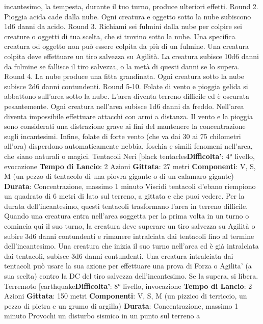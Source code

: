 \begin{multicols}{2}
incantesimo, la tempesta, durante il tuo turno, produce
ulteriori effetti.
Round 2. Pioggia acida cade dalla nube. Ogni creatura
e oggetto sotto la nube subiscono 1d6 danni da acido.
Round 3. Richiami sei fulmini dalla nube per colpire sei
creature o oggetti di tua scelta, che si trovino sotto la
nube. Una specifica creatura od oggetto non può
essere colpita da più di un fulmine. Una creatura colpita
deve effettuare un tiro salvezza su Agilità. La
creatura subisce 10d6 danni da fulmine se fallisce il tiro
salvezza, o la metà di questi danni se lo supera.
Round 4. La nube produce una fitta grandinata. Ogni
creatura sotto la nube subisce 2d6 danni contundenti.
Round 5-10. Folate di vento e pioggia gelida si
abbattono sull’area sotto la nube. L’area diventa terreno
difficile ed è oscurata pesantemente. Ogni creatura
nell’area subisce 1d6 danni da freddo. Nell’area diventa
impossibile effettuare attacchi con armi a distanza. Il
vento e la pioggia sono considerati una distrazione
grave ai fini del mantenere la concentrazione sugli
incantesimi. Infine, folate di forte vento (che va dai 30 ai
75 chilometri all’ora) disperdono automaticamente
nebbia, foschia e simili fenomeni nell’area, che siano
naturali o magici.
Tentacoli Neri
[black tentacles\textbf{Difficolta'}:
4° livello, evocazione
\textbf{Tempo di Lancio}: 2 Azioni
\textbf{Gittata}: 27 metri
\textbf{Componenti}: V, S, M (un pezzo di tentacolo di una
piovra gigante o di un calamaro gigante)
\textbf{Durata}: Concentrazione, massimo 1 minuto
Viscidi tentacoli d’ebano riempiono un quadrato di 6
metri di lato sul terreno, a gittata e che puoi vedere. Per
la durata dell’incantesimo, questi tentacoli trasformano
l’area in terreno difficile.
Quando una creatura entra nell’area soggetta per la
prima volta in un turno o comincia qui il suo turno, la
creatura deve superare un tiro salvezza su Agilità o
subire 3d6 danni contundenti e rimanere intralciata dai
tentacoli fino al termine dell’incantesimo. Una creatura
che inizia il suo turno nell’area ed è già intralciata dai
tentacoli, subisce 3d6 danni contundenti.
Una creatura intralciata dai tentacoli può usare la sua
azione per effettuare una prova di Forza o Agilita' (a
sua scelta) contro la DC del tiro salvezza
dell’incantesimo. Se la supera, si libera.
Terremoto
[earthquake\textbf{Difficolta'}:
8° livello, invocazione
\textbf{Tempo di Lancio}: 2 Azioni
\textbf{Gittata}: 150 metri
\textbf{Componenti}: V, S, M (un pizzico di terriccio, un pezzo
di pietra e un grumo di argilla)
\textbf{Durata}: Concentrazione, massimo 1 minuto
Provochi un disturbo sismico in un punto sul terreno a

\end{multicols}
